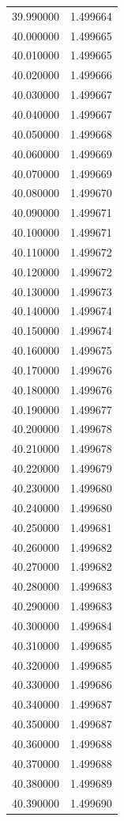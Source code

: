 \begin{tabular}{rr}
39.990000 & 1.499664 \\
40.000000 & 1.499665 \\
40.010000 & 1.499665 \\
40.020000 & 1.499666 \\
40.030000 & 1.499667 \\
40.040000 & 1.499667 \\
40.050000 & 1.499668 \\
40.060000 & 1.499669 \\
40.070000 & 1.499669 \\
40.080000 & 1.499670 \\
40.090000 & 1.499671 \\
40.100000 & 1.499671 \\
40.110000 & 1.499672 \\
40.120000 & 1.499672 \\
40.130000 & 1.499673 \\
40.140000 & 1.499674 \\
40.150000 & 1.499674 \\
40.160000 & 1.499675 \\
40.170000 & 1.499676 \\
40.180000 & 1.499676 \\
40.190000 & 1.499677 \\
40.200000 & 1.499678 \\
40.210000 & 1.499678 \\
40.220000 & 1.499679 \\
40.230000 & 1.499680 \\
40.240000 & 1.499680 \\
40.250000 & 1.499681 \\
40.260000 & 1.499682 \\
40.270000 & 1.499682 \\
40.280000 & 1.499683 \\
40.290000 & 1.499683 \\
40.300000 & 1.499684 \\
40.310000 & 1.499685 \\
40.320000 & 1.499685 \\
40.330000 & 1.499686 \\
40.340000 & 1.499687 \\
40.350000 & 1.499687 \\
40.360000 & 1.499688 \\
40.370000 & 1.499688 \\
40.380000 & 1.499689 \\
40.390000 & 1.499690 \\

\end{tabular}
